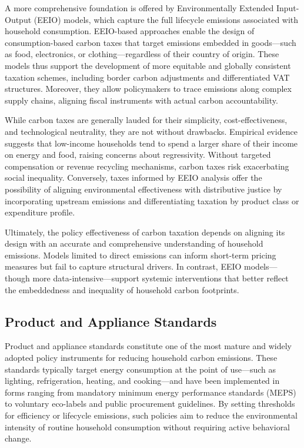\documentclass[12pt,a4paper]{article}%
\begin{document}
A more comprehensive foundation is offered by Environmentally Extended Input-Output (EEIO) models, which capture the full lifecycle emissions associated with household consumption. EEIO-based approaches enable the design of consumption-based carbon taxes that target emissions embedded in goods—such as food, electronics, or clothing—regardless of their country of origin. These models thus support the development of more equitable and globally consistent taxation schemes, including border carbon adjustments and differentiated VAT structures. Moreover, they allow policymakers to trace emissions along complex supply chains, aligning fiscal instruments with actual carbon accountability.

While carbon taxes are generally lauded for their simplicity, cost-effectiveness, and technological neutrality, they are not without drawbacks. Empirical evidence suggests that low-income households tend to spend a larger share of their income on energy and food, raising concerns about regressivity. Without targeted compensation or revenue recycling mechanisms, carbon taxes risk exacerbating social inequality. Conversely, taxes informed by EEIO analysis offer the possibility of aligning environmental effectiveness with distributive justice by incorporating upstream emissions and differentiating taxation by product class or expenditure profile.

Ultimately, the policy effectiveness of carbon taxation depends on aligning its design with an accurate and comprehensive understanding of household emissions. Models limited to direct emissions can inform short-term pricing measures but fail to capture structural drivers. In contrast, EEIO models—though more data-intensive—support systemic interventions that better reflect the embeddedness and inequality of household carbon footprints.

\subsection{Product and Appliance Standards}

Product and appliance standards constitute one of the most mature and widely adopted policy instruments for reducing household carbon emissions. These standards typically target energy consumption at the point of use—such as lighting, refrigeration, heating, and cooking—and have been implemented in forms ranging from mandatory minimum energy performance standards (MEPS) to voluntary eco-labels and public procurement guidelines. By setting thresholds for efficiency or lifecycle emissions, such policies aim to reduce the environmental intensity of routine household consumption without requiring active behavioral change.
\end{document}
